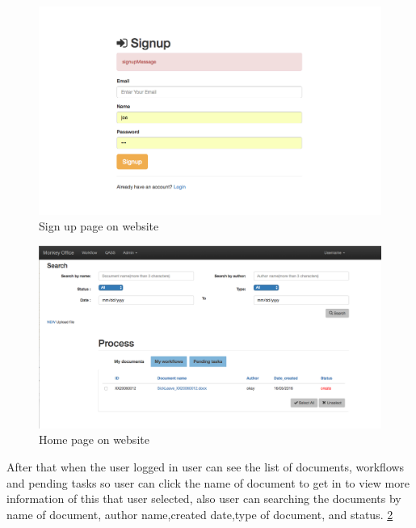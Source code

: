 \begin{figure}[h!]

	\centering
	\includegraphics[scale=0.4]{res/Screen_Shot3}
	\caption{Sign up page on website}
	\label{fig:screenshot_signup}
\end{figure}



\begin{figure}[h!]

	\centering
	\includegraphics[scale=0.3]{res/Screen_Shot2}
	\caption{Home page on website}
	\label{fig:screenshot_home}
\end{figure}

After that when the user logged in 	user can see the list of documents, workflows and pending tasks so user can click the name of document to get in to view more information of this that user selected, also user can searching the documents by name of document, author name,created date,type of document, and status. \ref{fig:screenshot_home}




